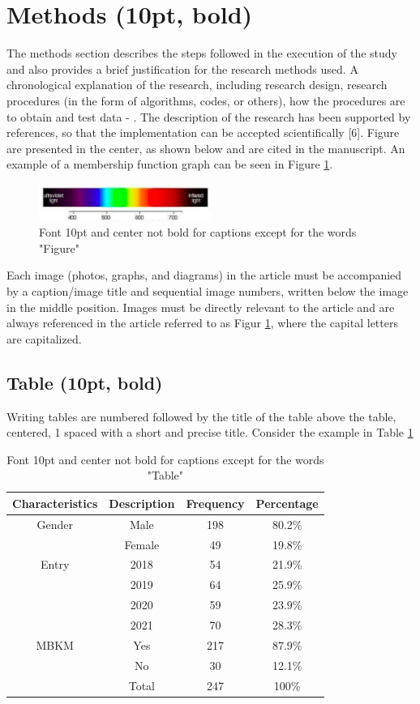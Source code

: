 \documentclass{article}
\begin{document}
\section{Methods (10pt, bold)}
The methods section describes the steps followed in the execution of the study and also provides a brief justification for the research methods used. A chronological explanation of the research, including research design, research procedures (in the form of algorithms, codes, or others), how the procedures are to obtain and test data \cite{Lo} - \cite{Hang}. The description of the research has been supported by references, so that the implementation can be accepted scientifically [6]. Figure are presented in the center, as shown below and are cited in the manuscript. An example of a membership function graph can be seen in Figure \ref{table1}.

\begin{figure}[h]
	\centering
	\includegraphics[width=0.5\textwidth]{images/figur1.PNG}
	\caption{Font 10pt and center not bold for captions except for the words "Figure"}
	\label{fig1}
\end{figure}

Each image (photos, graphs, and diagrams) in the article must be accompanied by a caption/image title and sequential image numbers, written below the image in the middle position. Images must be directly relevant to the article and are always referenced in the article referred to as Figur \ref{table1}, where the capital letters are capitalized.

\subsection{Table (10pt, bold)}
Writing tables are numbered followed by the title of the table above the table, centered, 1 spaced with a short and precise title. Consider the example in Table \ref{table1}
\begin{table}[h]
	\centering
	\caption{Font 10pt and center not bold for captions except for the words "Table"}
	\label{table1}
	\begin{tabular}{@{}cccc@{}}
		\toprule
		\textbf{Characteristics}& \textbf{Description }& \textbf{Frequency }& \textbf{Percentage} \\
		\midrule
		Gender & Male & 198 & 80.2\% \\
		& Female & 49 & 19.8\% \\
		Entry & 2018 & 54 & 21.9\% \\
		& 2019 & 64 & 25.9\% \\
		& 2020 & 59 & 23.9\% \\
		& 2021 & 70 & 28.3\% \\
		MBKM & Yes & 217 & 87.9\% \\
		& No & 30 & 12.1\% \\
		& Total & 247 & 100\% \\
		\bottomrule
	\end{tabular}
\end{table}
\end{document}

